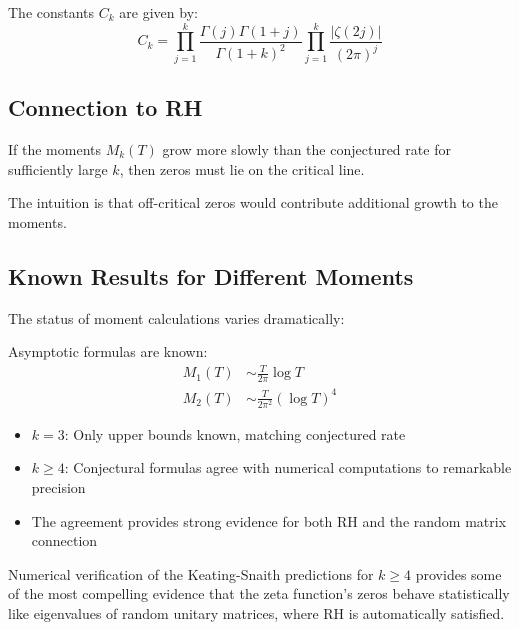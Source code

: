 The constants $C_k$ are given by:
\begin{equation}
C_k = \prod_{j=1}^k \frac{\Gamma(j)\Gamma(1+j)}{\Gamma(1+k)^2} \prod_{j=1}^k \frac{|\zeta(2j)|}{(2\pi)^j}
\end{equation}

\subsection{Connection to RH}

\begin{theorem}
If the moments $M_k(T)$ grow more slowly than the conjectured rate for sufficiently large $k$, then zeros must lie on the critical line.
\end{theorem}

The intuition is that off-critical zeros would contribute additional growth to the moments.

\subsection{Known Results for Different Moments}

The status of moment calculations varies dramatically:

\begin{theorem}
Asymptotic formulas are known:
\begin{align}
M_1(T) &\sim \frac{T}{2\pi} \log T \\
M_2(T) &\sim \frac{T}{2\pi^2} (\log T)^4
\end{align}
\end{theorem}

\begin{theorem}
\begin{itemize}
\item $k = 3$: Only upper bounds known, matching conjectured rate
\item $k \geq 4$: Conjectural formulas agree with numerical computations to remarkable precision
\item The agreement provides strong evidence for both RH and the random matrix connection
\end{itemize}
\end{theorem}

\begin{remark}
Numerical verification of the Keating-Snaith predictions for $k \geq 4$ provides some of the most compelling evidence that the zeta function's zeros behave statistically like eigenvalues of random unitary matrices, where RH is automatically satisfied.
\end{remark}


